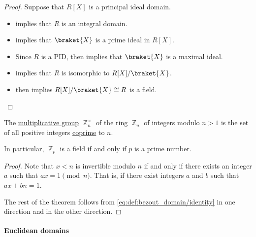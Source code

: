 \begin{proof}
  \NecessitySubProof* Suppose that \( R[X] \) is a principal ideal domain.
  \begin{itemize}
    \item {} implies that \( R \) is an integral domain.
    \item {} implies that \( \braket{ X } \) is a prime ideal in \( R[X] \).
    \item Since \( R \) is a PID,  then implies that \( \braket{ X } \) is a maximal ideal.
    \item {} implies that \( R \) is isomorphic to \( R[X] / \braket{ X } \).
    \item {} then implies \( R[X] / \braket{ X } \cong R \) is a field.
  \end{itemize}
\end{proof}

\begin{proposition}\label{thm:multiplicative_group_of_integers_modulo}
  The \hyperref[def:semiring]{multiplicative group} \( \BbbZ_n^\times \) of the ring \hyperref[def:ring_of_integers_modulo]{\( \BbbZ_n \)} of integers modulo \( n > 1 \) is the set of all positive integers \hyperref[def:coprime_elements]{coprime} to \( n \).
\end{proposition}
\begin{comments}
  \item In particular, \( \BbbZ_p \) is a \hyperref[def:field]{field} if and only if \( p \) is a \hyperref[def:prime_number]{prime number}.
\end{comments}
\begin{proof}
  Note that \( x < n \) is invertible modulo \( n \) if and only if there exists an integer \( a \) such that \( ax = 1 \pmod n \). That is, if there exist integers \( a \) and \( b \) such that \( ax + bn = 1 \).

  The rest of the theorem follows from \eqref{eq:def:bezout_domain/identity} in one direction and  in the other direction.
\end{proof}

\paragraph{Euclidean domains}

